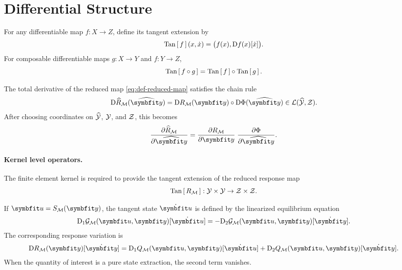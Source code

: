 \section{Differential Structure}

For any differentiable map \(f:X\to Z\), define its tangent extension by
\[
\operatorname{Tan}\left[\,f\,\right](x,\dot x)
=
\bigl(
f(x),
\mathrm D f(x)[\dot x]
\bigr).
\]
For composable differentiable maps \(g:X\to Y\) and \(f:Y\to Z\),
\[
\operatorname{Tan}\left[\,f\circ g\,\right] = \operatorname{Tan}\left[\,f\,\right]\circ\operatorname{Tan}\left[\,g\,\right].
\]

The total derivative of the reduced map \eqref{eq:def-reduced-map} satisfies the chain rule
\begin{equation}
\label{eq:composed-derivative}
\D \ComposedResponse_{\ModelFamily}(\HostParameters)
=
\D \ResponseMap_{\ModelFamily}(\CoreParameters)
\circ
\D \ParameterMap(\HostParameters)
\in \mathcal L(\HostSpace,\ResponseSpace).
\end{equation}
After choosing coordinates on \(\widehat{\mathcal Y}\), \(\mathcal Y\), and \(\mathcal Z\), this becomes
\begin{equation}
\label{eq:composed-jacobian}
\frac{\partial \ComposedResponse_{\ModelFamily}}{\partial \HostParameters}
=
\frac{\partial \ResponseMap_{\ModelFamily}}{\partial \CoreParameters}
\;
\frac{\partial \ParameterMap}{\partial \HostParameters}.
\end{equation}

\paragraph{Kernel level operators.}

The finite element kernel is required to provide the tangent extension of the reduced response map
\[
\operatorname{Tan}\left[\,R_{\mathcal M}\,\right] :
\mathcal Y \times \mathcal Y
\to
\mathcal Z \times \mathcal Z.
\]

If \(\State=\StateMap_{\ModelFamily}(\CoreParameters)\), the tangent state \(\dot{\State}\) is defined by the linearized equilibrium equation
\[
\D_1 \Residual_{\ModelFamily}(\State,\CoreParameters)[\dot{\State}]
=
-
\D_2 \Residual_{\ModelFamily}(\State,\CoreParameters)[\dot{\CoreParameters}].
\]
The corresponding response variation is
\[
\D \ResponseMap_{\ModelFamily}(\CoreParameters)[\dot{\CoreParameters}]
=
\D_1 \Observation_{\ModelFamily}(\State,\CoreParameters)[\dot{\State}]
+
\D_2 \Observation_{\ModelFamily}(\State,\CoreParameters)[\dot{\CoreParameters}].
\]
When the quantity of interest is a pure state extraction, the second term vanishes.

